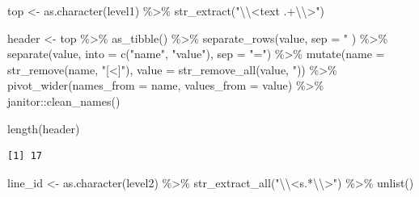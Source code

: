 \documentclass[
  letterpaper,
]{scrbook}
\newenvironment{Shaded}{\begin{snugshade}}{\end{snugshade}}
\newcommand{\AttributeTok}[1]{\textcolor[rgb]{0.40,0.45,0.13}{#1}}
\newcommand{\FunctionTok}[1]{\textcolor[rgb]{0.28,0.35,0.67}{#1}}
\newcommand{\NormalTok}[1]{\textcolor[rgb]{0.00,0.23,0.31}{#1}}
\newcommand{\OtherTok}[1]{\textcolor[rgb]{0.00,0.23,0.31}{#1}}
\newcommand{\SpecialCharTok}[1]{\textcolor[rgb]{0.37,0.37,0.37}{#1}}
\newcommand{\StringTok}[1]{\textcolor[rgb]{0.13,0.47,0.30}{#1}}
\begin{document}
\begin{Shaded}
\begin{Highlighting}[]
\NormalTok{top }\OtherTok{\textless{}{-}} \FunctionTok{as.character}\NormalTok{(level1) }\SpecialCharTok{\%\textgreater{}\%} \FunctionTok{str\_extract}\NormalTok{(}\StringTok{"}\SpecialCharTok{\textbackslash{}\textbackslash{}}\StringTok{\textless{}text .+}\SpecialCharTok{\textbackslash{}\textbackslash{}}\StringTok{\textgreater{}"}\NormalTok{)}

\NormalTok{header }\OtherTok{\textless{}{-}}\NormalTok{ top }\SpecialCharTok{\%\textgreater{}\%} 
  \FunctionTok{as\_tibble}\NormalTok{() }\SpecialCharTok{\%\textgreater{}\%} 
  \FunctionTok{separate\_rows}\NormalTok{(value, }\AttributeTok{sep =} \StringTok{\textquotesingle{}" \textquotesingle{}}\NormalTok{) }\SpecialCharTok{\%\textgreater{}\%} 
  \FunctionTok{separate}\NormalTok{(value, }\AttributeTok{into =} \FunctionTok{c}\NormalTok{(}\StringTok{"name"}\NormalTok{, }\StringTok{"value"}\NormalTok{), }\AttributeTok{sep =} \StringTok{"="}\NormalTok{) }\SpecialCharTok{\%\textgreater{}\%} 
  \FunctionTok{mutate}\NormalTok{(}\AttributeTok{name =} \FunctionTok{str\_remove}\NormalTok{(name, }\StringTok{"[\textless{}]"}\NormalTok{),}
         \AttributeTok{value =} \FunctionTok{str\_remove\_all}\NormalTok{(value, }\StringTok{\textquotesingle{}"\textquotesingle{}}\NormalTok{)) }\SpecialCharTok{\%\textgreater{}\%} 
  \FunctionTok{pivot\_wider}\NormalTok{(}\AttributeTok{names\_from =}\NormalTok{ name, }\AttributeTok{values\_from =}\NormalTok{ value) }\SpecialCharTok{\%\textgreater{}\%} 
\NormalTok{  janitor}\SpecialCharTok{::}\FunctionTok{clean\_names}\NormalTok{()}

\FunctionTok{length}\NormalTok{(header)}
\end{Highlighting}
\end{Shaded}

\begin{verbatim}
[1] 17
\end{verbatim}

\begin{Shaded}
\begin{Highlighting}[]
\NormalTok{line\_id }\OtherTok{\textless{}{-}} \FunctionTok{as.character}\NormalTok{(level2) }\SpecialCharTok{\%\textgreater{}\%} \FunctionTok{str\_extract\_all}\NormalTok{(}\StringTok{"}\SpecialCharTok{\textbackslash{}\textbackslash{}}\StringTok{\textless{}s.*}\SpecialCharTok{\textbackslash{}\textbackslash{}}\StringTok{\textgreater{}"}\NormalTok{) }\SpecialCharTok{\%\textgreater{}\%} \FunctionTok{unlist}\NormalTok{()}
\end{Highlighting}
\end{Shaded}
\end{document}
